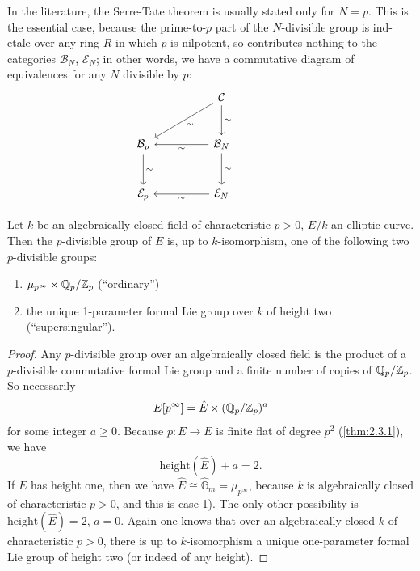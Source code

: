 \begin{remark}\label{rem:2.9.2}
In the literature, the Serre-Tate theorem is usually stated only for $N = p$. This is the essential case, because the prime-to-$p$ part of the $N$-divisible group is ind-etale over any ring $R$ in which $p$ is nilpotent, so contributes nothing to the categories $\mathcal{B}_N$, $\mathcal{E}_N$; in other words, we have a commutative diagram of equivalences for any $N$ divisible by $p$:
\[
\begin{tikzcd}[row sep=large, column sep=huge]
  & \mathcal{C} \arrow[dl, "\sim"] \arrow[d, "\sim"] & \\
  \mathcal{B}_p \arrow[d, "\sim"] & \mathcal{B}_N \arrow[l, "\sim"] \arrow[d, "\sim"] & \\
  \mathcal{E}_p & \mathcal{E}_N \arrow[l, "\sim"] &
\end{tikzcd}
\]
\end{remark}

\begin{theorem}\label{thm:2.9.3}
Let $k$ be an algebraically closed field of characteristic $p > 0$, $E/k$ an elliptic curve. Then the $p$-divisible group of $E$ is, up to $k$-isomorphism, one of the following two $p$-divisible groups:
\begin{enumerate}
\item[1)] $\mu_{p^\infty} \times \mathbb{Q}_p/\mathbb{Z}_p$ (``ordinary'')
\item[2)] the unique 1-parameter formal Lie group over $k$ of height two (``supersingular'').
\end{enumerate}
\end{theorem}

\begin{proof}
Any $p$-divisible group over an algebraically closed field is the product of a $p$-divisible commutative formal Lie group and a finite number of copies of $\mathbb{Q}_p/\mathbb{Z}_p$. So necessarily
\[
E[p^\infty] = \hat{E} \times (\mathbb{Q}_p/\mathbb{Z}_p)^a
\]
for some integer $a \ge 0$. Because $p : E \to E$ is finite flat of degree $p^2$ (\ref{thm:2.3.1}), we have
\[
\mathrm{height}(\hat{E}) + a = 2.
\]
If $E$ has height one, then we have $\hat{E} \cong \hat{\mathbb{G}}_m = \mu_{p^\infty}$, because $k$ is algebraically closed of characteristic $p > 0$, and this is case 1). The only other possibility is $\mathrm{height}(\hat{E}) = 2$, $a = 0$. Again one knows that over an algebraically closed $k$ of characteristic $p > 0$, there is up to $k$-isomorphism a unique one-parameter formal Lie group of height two (or indeed of any height).
\end{proof}

